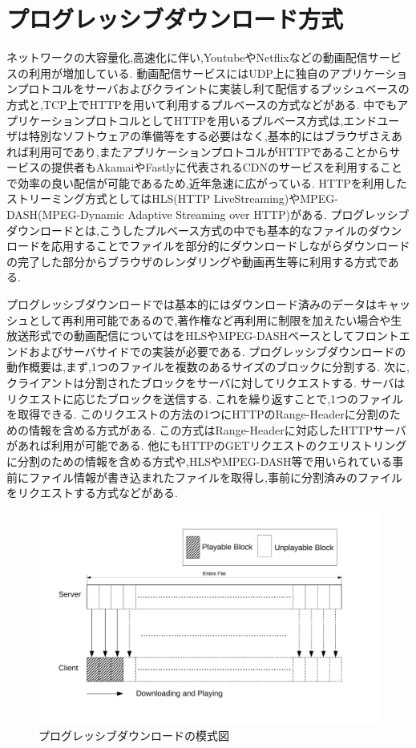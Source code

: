 \documentclass[a4j,12pt]{gradthesis_utf8}
\begin{document}
\section{プログレッシブダウンロード方式}
ネットワークの大容量化,高速化に伴い,Youtube\cite{youtube}やNetflix\cite{netflix}などの動画配信サービスの利用が増加している.
動画配信サービスにはUDP上に独自のアプリケーションプロトコルをサーバおよびクライントに実装し利て配信するプッシュベースの方式と,TCP上でHTTPを用いて利用するプルベースの方式などがある\cite{streaming}.
中でもアプリケーションプロトコルとしてHTTPを用いるプルベース方式は,エンドユーザは特別なソフトウェアの準備等をする必要はなく,基本的にはブラウザさえあれば利用可であり,またアプリケーションプロトコルがHTTPであることからサービスの提供者もAkamaiやFastlyに代表されるCDNのサービスを利用することで効率の良い配信が可能であるため,近年急速に広がっている.
HTTPを利用したストリーミング方式としてはHLS(HTTP LiveStreaming)\cite{hls}やMPEG-DASH(MPEG-Dynamic Adaptive Streaming over HTTP)\cite{dash}がある.
プログレッシブダウンロードとは,こうしたプルベース方式の中でも基本的なファイルのダウンロードを応用することでファイルを部分的にダウンロードしながらダウンロードの完了した部分からブラウザのレンダリングや動画再生等に利用する方式である.

プログレッシブダウンロードでは基本的にはダウンロード済みのデータはキャッシュとして再利用可能であるので,著作権など再利用に制限を加えたい場合や生放送形式での動画配信についてはをHLSやMPEG-DASHベースとしてフロントエンドおよびサーバサイドでの実装が必要である.
プログレッシブダウンロードの動作概要は,まず,1つのファイルを複数のあるサイズのブロックに分割する.
次に,クライアントは分割されたブロックをサーバに対してリクエストする.
サーバはリクエストに応じたブロックを送信する.
これを繰り返すことで,1つのファイルを取得できる.
このリクエストの方法の1つにHTTPのRange-Headerに分割のための情報を含める方式がある.
この方式はRange-Headerに対応したHTTPサーバがあれば利用が可能である.
他にもHTTPのGETリクエストのクエリストリングに分割のための情報を含める方式や,HLSやMPEG-DASH等で用いられている事前にファイル情報が書き込まれたファイルを取得し,事前に分割済みのファイルをリクエストする方式などがある.

\begin{figure}[h]
	\centering
	\includegraphics[width=17.5cm]{figure/p-dl.pdf}
	\caption{プログレッシブダウンロードの模式図}
	\label{p-dl}
\end{figure}
\end{document}
